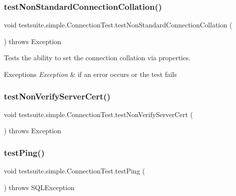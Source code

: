 \subsubsection{\texorpdfstring{test\+Non\+Standard\+Connection\+Collation()}{testNonStandardConnectionCollation()}}
{\footnotesize\ttfamily void testsuite.\+simple.\+Connection\+Test.\+test\+Non\+Standard\+Connection\+Collation (\begin{DoxyParamCaption}{ }\end{DoxyParamCaption}) throws Exception}

Tests the ability to set the connection collation via properties.


\begin{DoxyExceptions}{Exceptions}
{\em Exception} & if an error occurs or the test fails \\
\hline
\end{DoxyExceptions}
\mbox{\label{classtestsuite_1_1simple_1_1_connection_test_a728791cc1f2724f19b673701ea51362d}} 
\subsubsection{\texorpdfstring{test\+Non\+Verify\+Server\+Cert()}{testNonVerifyServerCert()}}
{\footnotesize\ttfamily void testsuite.\+simple.\+Connection\+Test.\+test\+Non\+Verify\+Server\+Cert (\begin{DoxyParamCaption}{ }\end{DoxyParamCaption}) throws Exception}

\mbox{\label{classtestsuite_1_1simple_1_1_connection_test_a532ba6cd7d05b27ab48c9c6024baeca6}} 
\subsubsection{\texorpdfstring{test\+Ping()}{testPing()}}
{\footnotesize\ttfamily void testsuite.\+simple.\+Connection\+Test.\+test\+Ping (\begin{DoxyParamCaption}{ }\end{DoxyParamCaption}) throws S\+Q\+L\+Exception}

